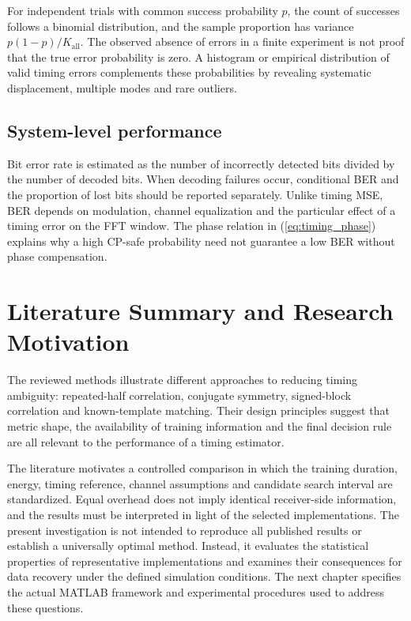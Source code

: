 For independent trials with common success probability $p$, the count of successes follows a binomial distribution, and the sample proportion has variance $p(1-p)/K_{\mathrm{all}}$. The observed absence of errors in a finite experiment is not proof that the true error probability is zero. A histogram or empirical distribution of valid timing errors complements these probabilities by revealing systematic displacement, multiple modes and rare outliers.

\subsection{System-level performance}
Bit error rate is estimated as the number of incorrectly detected bits divided by the number of decoded bits. When decoding failures occur, conditional BER and the proportion of lost bits should be reported separately. Unlike timing MSE, BER depends on modulation, channel equalization and the particular effect of a timing error on the FFT window. The phase relation in (\ref{eq:timing_phase}) explains why a high CP-safe probability need not guarantee a low BER without phase compensation.

\section{Literature Summary and Research Motivation}
The reviewed methods illustrate different approaches to reducing timing ambiguity: repeated-half correlation, conjugate symmetry, signed-block correlation and known-template matching. Their design principles suggest that metric shape, the availability of training information and the final decision rule are all relevant to the performance of a timing estimator.

The literature motivates a controlled comparison in which the training duration, energy, timing reference, channel assumptions and candidate search interval are standardized. Equal overhead does not imply identical receiver-side information, and the results must be interpreted in light of the selected implementations. The present investigation is not intended to reproduce all published results or establish a universally optimal method. Instead, it evaluates the statistical properties of representative implementations and examines their consequences for data recovery under the defined simulation conditions. The next chapter specifies the actual MATLAB framework and experimental procedures used to address these questions.
